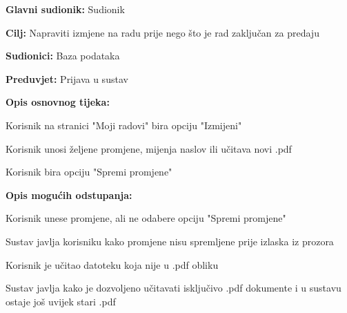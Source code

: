 					\noindent {}
					\begin{packed_item}
						\item \textbf{Glavni sudionik:} Sudionik
						\item \textbf{Cilj:} Napraviti izmjene na radu prije nego što je rad zaključan za predaju
						\item \textbf{Sudionici:} Baza podataka
						\item \textbf{Preduvjet:} Prijava u sustav
						
						\item \textbf{Opis osnovnog tijeka:} 
						\item[] \begin{packed_enum}
							\item Korisnik na stranici "Moji radovi" bira opciju "Izmijeni"
							\item Korisnik unosi željene promjene, mijenja naslov ili učitava novi .pdf
							\item Korisnik bira opciju "Spremi promjene"
						\end{packed_enum}
					
						\item \textbf{Opis mogućih odstupanja:}
						\item[] \begin{packed_enum}

							\item[2.a] Korisnik unese promjene, ali ne odabere opciju "Spremi promjene"
							\item[] \begin{packed_enum}
								\item[1.] Sustav javlja korisniku kako promjene nisu spremljene prije izlaska iz prozora
							\end{packed_enum}
							\item[2.b] Korisnik je učitao datoteku koja nije u .pdf obliku
							\item[] \begin{packed_enum}
								\item[1.] Sustav javlja kako je dozvoljeno učitavati isključivo .pdf dokumente i u sustavu ostaje još uvijek stari .pdf
							\end{packed_enum}
							
						\end{packed_enum}
					\end{packed_item}


